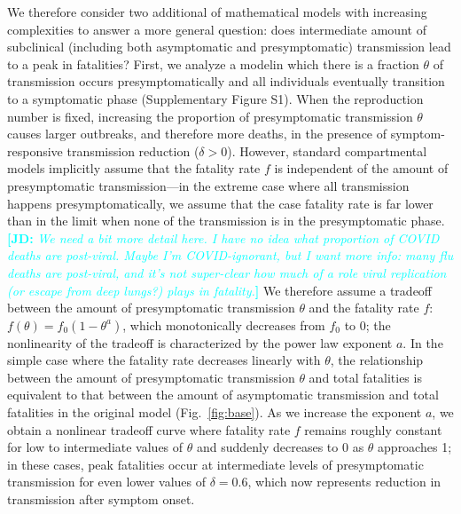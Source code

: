 \documentclass[12pt]{article}
\newcommand{\comment}{\showcomment}
\newcommand{\showcomment}[3]{\textcolor{#1}{\textbf{[#2: }\textsl{#3}\textbf{]}}}
\newcommand{\jd}[1]{\comment{cyan}{JD}{#1}}
\newcommand{\fref}[1]{Fig.~\ref{fig:#1}}
\begin{document}
We therefore consider two additional of mathematical models with increasing complexities to answer a more general question:
does intermediate amount of subclinical (including both asymptomatic and presymptomatic) transmission lead to a peak in fatalities?
First, we analyze a modelin which there is a fraction $\theta$ of transmission occurs presymptomatically and all individuals eventually transition to a symptomatic phase (Supplementary Figure S1).
When the reproduction number is fixed, increasing the proportion of presymptomatic transmission $\theta$ causes larger outbreaks, and therefore more deaths, in the presence of symptom-responsive transmission reduction ($\delta > 0$).
However, standard compartmental models implicitly assume that the fatality rate $f$ is independent of the amount of presymptomatic transmission---in the extreme case where all transmission happens presymptomatically, we assume that the case fatality rate is far lower than in the limit when none of the transmission is in the presymptomatic phase.
\jd{We need a bit more detail here. I have no idea what proportion of COVID deaths are post-viral. Maybe I'm COVID-ignorant, but I want more info: many flu deaths are post-viral, and it's not super-clear how much of a role viral replication (or escape from deep lungs?) plays in fatality.}
We therefore assume a tradeoff between the amount of presymptomatic transmission $\theta$ and the fatality rate $f$: $f(\theta) = f_0 (1-\theta^a)$, which monotonically decreases from $f_0$ to 0; the nonlinearity of the tradeoff is characterized by the power law exponent $a$.
In the simple case where the fatality rate decreases linearly with $\theta$, the relationship between the amount of presymptomatic transmission $\theta$ and total fatalities is equivalent to that between the amount of asymptomatic transmission and total fatalities in the original model (\fref{base}).
As we increase the exponent $a$, we obtain a nonlinear tradeoff curve where fatality rate $f$ remains roughly constant for low to intermediate values of $\theta$ and suddenly decreases to $0$ as $\theta$ approaches 1;
in these cases, peak fatalities occur at intermediate levels of presymptomatic transmission for even lower values of $\delta=0.6$, which now represents reduction in transmission after symptom onset.
\end{document}
